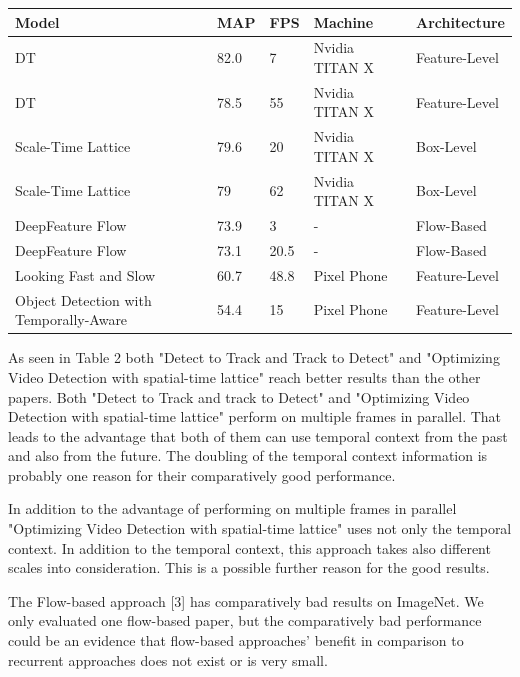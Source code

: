 \documentclass[conference]{IEEEtran}
\begin{document}
\begin{tabular}{ | p{2cm} | p{2em}| p{2em} | p{4em} | p{5em} | } 
 \hline
 Model & MAP & FPS & Machine & Architecture \\
 \hline
 DT \cite{b8} & 82.0 & 7 & Nvidia TITAN X & Feature-Level \\
 \hline
 DT \cite{b8} & 78.5 & 55 & Nvidia TITAN X & Feature-Level \\
 \hline
 Scale-Time Lattice \cite{b10} & 79.6 & 20 & Nvidia TITAN X & Box-Level \\
 \hline
 Scale-Time Lattice \cite{b10} & 79 & 62 & Nvidia TITAN X & Box-Level \\
 \hline
 DeepFeature Flow \cite{b3} & 73.9 & 3 & - & Flow-Based \\
 \hline
 DeepFeature Flow \cite{b3} & 73.1 & 20.5 & - & Flow-Based \\
 \hline
 Looking Fast and Slow \cite{b7} & 60.7 & 48.8 & Pixel Phone & Feature-Level \\
 \hline
 Object Detection with Temporally-Aware \cite{b2} & 54.4 & 15 & Pixel Phone & Feature-Level \\
 \hline
\end{tabular} \newline

As seen in Table 2 both "Detect to Track and Track to Detect" and "Optimizing Video Detection with spatial-time lattice" reach better results than the other papers. Both "Detect to Track and track to Detect" and "Optimizing Video Detection with spatial-time lattice" perform on multiple frames in parallel. That leads to the advantage that both of them can use temporal context from the past and also from the future. The doubling of the temporal context information is probably one reason for their comparatively good performance. \newline

In addition to the advantage of performing on multiple frames in parallel "Optimizing Video Detection with spatial-time lattice" uses not only the temporal context. In addition to the temporal context, this approach takes also different scales into consideration. This is a possible further reason for the good results. \newline

The Flow-based approach [3] has comparatively bad results on ImageNet. We only evaluated one flow-based paper, but the comparatively bad performance could be an evidence that flow-based approaches' benefit in comparison to recurrent approaches does not exist or is very small. \newline
\end{document}
